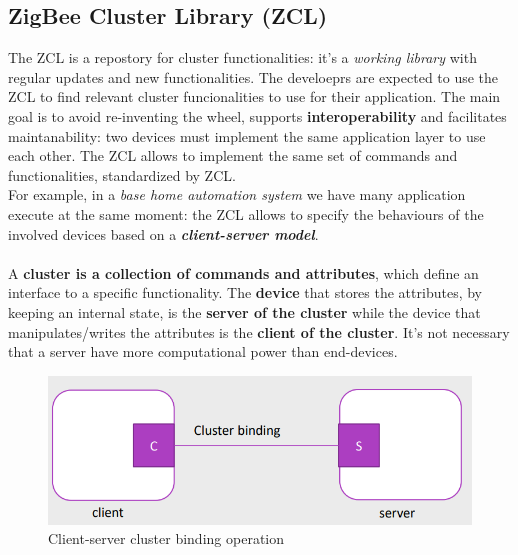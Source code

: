 \documentclass[10pt,a4paper]{report}
\theoremstyle{definition}
\begin{document}
\subsection{ZigBee Cluster Library (ZCL)}\label{sec:zigbee-cluster-library-zcl}
The ZCL is a repostory for cluster functionalities: it's a \textit{working library} with regular updates and new functionalities. The develoeprs are expected to use the ZCL to find relevant cluster funcionalities to use for their application.
The main goal is to avoid re-inventing the wheel, supports \textbf{interoperability} and facilitates maintanability: two devices must implement the same application layer to use each other. The ZCL allows to implement the same set of commands and functionalities, standardized by ZCL.\\
For example, in a \textit{base home automation system} we have many application execute at the same moment: the ZCL allows to specify the behaviours of the involved devices based on a \textit{\textbf{client-server model}}.\\\\
A \textbf{cluster is a collection of commands and attributes}, which define an interface to a specific functionality.
The \textbf{device} that stores the attributes, by keeping an internal state, is the \textbf{server of the cluster} while  the device that manipulates/writes the attributes is the \textbf{client of the cluster}.
It's not necessary that a server have more computational power than end-devices.
\begin{figure}[h!]
	\centering\includegraphics[scale=0.40]{images/Pasted image 20230311165232.png}
	\caption{Client-server cluster binding operation}
\end{figure}
\end{document}
